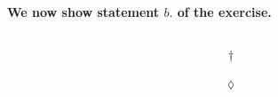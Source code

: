 \textbf{We now show statement $\mathit{b.}$ of the exercise.}\\\\
\begin{comment}
\textit{Case b1: $P_0$ lies in region I, $P_1$  lies in region II.} \\
Those two regions are separated by the $3$-flat (plane) $y_4=0$. So it's suffice that $R^2=0$ for $\phi(u)$ being zero. Hence $y_i=0$, $  i=1,2,3$, and the curve will cut the cone at it's apex.
\\\\
\textit{Case b2: $P_0$ lies in region I or II, $P_1$  lies in region III.} \\
Put
\begin{align*}
R^2&= \left(y_1\right)^2+\left(y_2\right)^2+\left(y_3\right)^2\\
{R_{0}}^2&= \left(y^0_1\right)^2+\left(y^0_2\right)^2+\left(y^0_3\right)^2\\
{R_{1}}^2&= \left(y^1_1\right)^2+\left(y^1_2\right)^2+\left(y^1_3\right)^2
\end{align*}
For the points on the curve, $R^2$ can then be written as 
\begin{align*}
R^2&= \left(R_1^2-R_0^2\right)u+R_0^2
\end{align*}
Then \begin{align}
&\phi(u) = \left(R_1^2-R_0^2\right)u+R_0^2 - \left[\left(y_4^{(1)}\right)^2   -\left(y_4^{(0)}\right)^2 \right]u -\left(y_4^{(0)}\right)^2 \quad \text{(see (1))}
\end{align}\\
We have the following conditions:\\
\begin{align*}
\left\{\begin {matrix}
\phi_0 < 0&\wedge &\phi_1  > 0\\\\
R_0^2 > (y_4^{0})^2&\wedge & R_1^2 < (y_4^{1})^2
\end{matrix}\right.
\end{align*}
Then, $$\exists  \  u \in \left[0,1\right]: \phi(u)=0$$
 From $(4)$ we have ,
\begin{align}
\phi(u)=0\quad\Rightarrow\spatie  &= -\frac{R_0^2- \left(y_4^{(0)}\right)^2}{R_1^2-R_0^2  -\left(y_4^{(1)}\right)^2  +\left(y_4^{(0)}\right)^2}
\end{align}

Let's simplify notationally the last equation. As $\phi_0 < 0\wedge \phi_1 > 0$, put $R_0^2- \left(y_4^{(0)}\right)^2=-\tau $ and $R_1^2- \left(y_4^{(1)}\right)^2=\sigma$ with both $\tau, \sigma > 0$. $(5)$ can be written as
\begin{align*}
u&=\frac{\tau}{\sigma +\tau}\\
 &=\frac{1}{1+\frac{\sigma}{\tau}}\\
\Rightarrow\spatie &\exists  \  u \in \left[0,1\right]: \phi(u)=0 \spatie \text{ as } \frac{\sigma}{\tau} >0
\end{align*}
So, there is a solution $u\in \left[0,1\right]$ for which $\phi(u)=0$ and the curve intersects the null cone.
\end{comment}
$$\dagger$$
\\$$\lozenge$$\\


